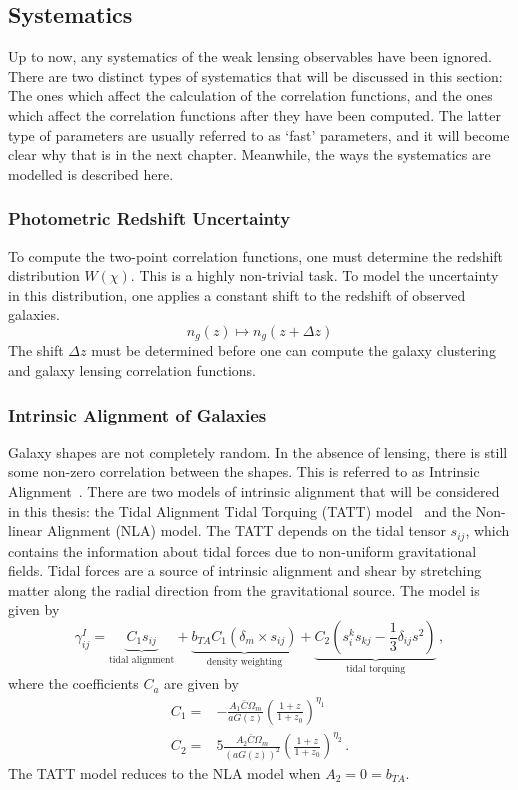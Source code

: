\subsection{Systematics}
Up to now, any systematics of the weak lensing observables have been ignored. There are two distinct types of systematics that will be discussed in this section: The ones which affect the calculation of the correlation functions, and the ones which affect the correlation functions after they have been computed. The latter type of parameters are usually referred to as `fast' parameters, and it will become clear why that is in the next chapter. Meanwhile, the ways the systematics are modelled is described here.
\subsubsection{Photometric Redshift Uncertainty}\label{sec:dz}
To compute the two-point correlation functions, one must determine the redshift distribution $W(\chi)$. This is a highly non-trivial task. To model the uncertainty in this distribution, one applies a constant shift to the redshift of observed galaxies.
\begin{equation}
	n_g(z) \mapsto n_g(z+\Delta z)
\end{equation}
The shift $\Delta z$ must be determined before one can compute the galaxy clustering and galaxy lensing correlation functions.
\subsubsection{Intrinsic Alignment of Galaxies}\label{sec:IA}
Galaxy shapes are not completely random. In the absence of lensing, there is still some non-zero correlation between the shapes. This is referred to as Intrinsic Alignment~\cite{troxel_intrinsic_2015,scott_dodelson_modern_2021}. There are two models of intrinsic alignment that will be considered in this thesis: the Tidal Alignment Tidal Torquing (TATT) model~\cite{krause_dark_2021,blazek_beyond_2019} and the Non-linear Alignment (NLA) model. The TATT depends on the tidal tensor $s_{ij}$, which contains the information about tidal forces due to non-uniform gravitational fields. Tidal forces are a source of intrinsic alignment and shear by stretching matter along the radial direction from the gravitational source. The model is given by
\begin{equation}
	\gamma_{ij}^I = \underbrace{C_1s_{ij}}_{\text{tidal alignment}}+
	\underbrace{b_{TA}C_1(\delta_m\times s_{ij})}_{\text{density weighting}}+
	\underbrace{C_2\left( s_i^ks_{kj}-\frac{1}{3}\delta_{ij}s^2 \right)}_{\text{tidal torquing}}\,,
\end{equation}
where the coefficients $C_a$ are given by
\begin{equation}
	\begin{split}
		C_1 =& -\frac{A_1\bar{C}\Omega_m}{aG(z)}\left(\frac{1+z}{1+z_0}\right)^{\eta_1} \\
		C_2 =& 5\frac{A_2\bar{C}\Omega_m}{(aG(z))^2}\left(\frac{1+z}{1+z_0}\right)^{\eta_2}\,.
	\end{split}
\end{equation}
The TATT model reduces to the NLA model when $A_2=0=b_{TA}$.

